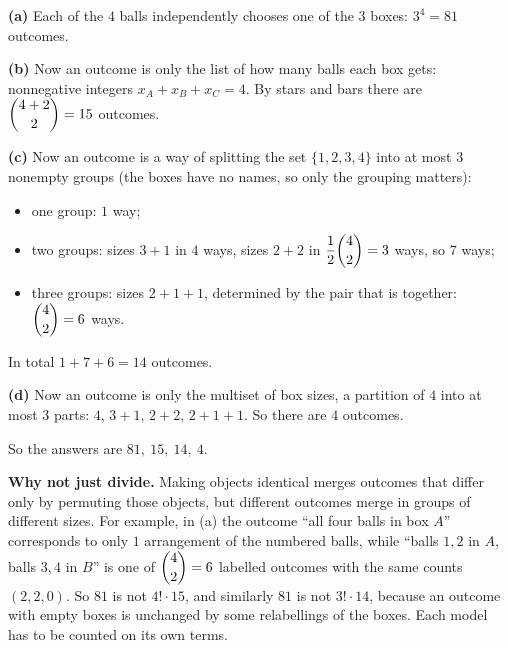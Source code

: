 \textbf{(a)} Each of the $4$ balls independently chooses one of the $3$ boxes: $3^4=81$ outcomes.

\textbf{(b)} Now an outcome is only the list of how many balls each box gets: nonnegative integers $x_A+x_B+x_C=4$. By stars and bars there are $\dbinom{4+2}{2}=15$ outcomes.

\textbf{(c)} Now an outcome is a way of splitting the set $\{1,2,3,4\}$ into at most $3$ nonempty groups (the boxes have no names, so only the grouping matters):
\begin{itemize}
\item one group: $1$ way;
\item two groups: sizes $3+1$ in $4$ ways, sizes $2+2$ in $\dfrac12\dbinom42=3$ ways, so $7$ ways;
\item three groups: sizes $2+1+1$, determined by the pair that is together: $\dbinom42=6$ ways.
\end{itemize}
In total $1+7+6=14$ outcomes.

\textbf{(d)} Now an outcome is only the multiset of box sizes, a partition of $4$ into at most $3$ parts: $4$, $3+1$, $2+2$, $2+1+1$. So there are $4$ outcomes.

So the answers are $\boxed{81,\ 15,\ 14,\ 4}$.

\textbf{Why not just divide.} Making objects identical merges outcomes that differ only by permuting those objects, but different outcomes merge in groups of different sizes. For example, in (a) the outcome ``all four balls in box $A$'' corresponds to only $1$ arrangement of the numbered balls, while ``balls $1,2$ in $A$, balls $3,4$ in $B$'' is one of $\dbinom42=6$ labelled outcomes with the same counts $(2,2,0)$. So $81$ is not $4!\cdot15$, and similarly $81$ is not $3!\cdot14$, because an outcome with empty boxes is unchanged by some relabellings of the boxes. Each model has to be counted on its own terms.
